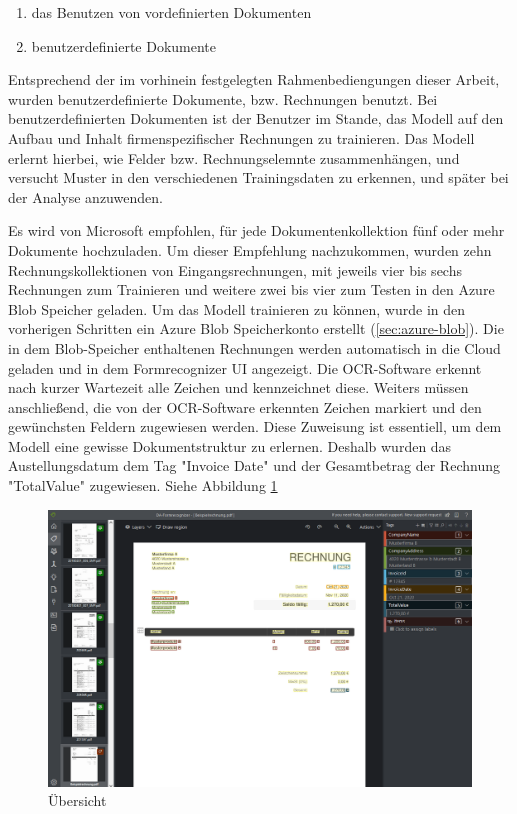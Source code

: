 \begin{enumerate}
    \item das Benutzen von vordefinierten Dokumenten 
    \item benutzerdefinierte Dokumente
\end{enumerate}

Entsprechend der im vorhinein festgelegten Rahmenbediengungen dieser Arbeit, wurden benutzerdefinierte Dokumente, bzw. Rechnungen benutzt.
Bei benutzerdefinierten Dokumenten ist der Benutzer im Stande, das Modell auf den Aufbau und Inhalt firmenspezifischer Rechnungen zu trainieren.
Das Modell erlernt hierbei, wie Felder bzw. Rechnungselemnte zusammenhängen, und versucht Muster in den verschiedenen Trainingsdaten zu erkennen, und später
bei der Analyse anzuwenden. 

Es wird von Microsoft empfohlen, für jede Dokumentenkollektion fünf oder mehr Dokumente hochzuladen. Um dieser Empfehlung nachzukommen, wurden zehn Rechnungskollektionen von Eingangsrechnungen, mit jeweils vier bis sechs Rechnungen zum Trainieren und weitere zwei bis vier zum Testen in den Azure Blob Speicher geladen. Um das Modell trainieren zu können, wurde in den vorherigen Schritten ein Azure Blob Speicherkonto erstellt (\ref{sec:azure-blob}). Die in dem Blob-Speicher enthaltenen Rechnungen werden automatisch in die Cloud geladen und in dem Formrecognizer UI angezeigt. Die OCR-Software erkennt nach kurzer Wartezeit alle Zeichen und kennzeichnet diese. Weiters müssen anschließend, die von der OCR-Software erkennten Zeichen markiert und den gewünchsten Feldern zugewiesen werden. Diese Zuweisung ist essentiell, um dem Modell eine gewisse Dokumentstruktur zu erlernen. Deshalb wurden das Austellungsdatum dem Tag "Invoice Date" und der Gesamtbetrag der Rechnung "TotalValue" zugewiesen.
Siehe Abbildung \ref{fig:formrecognizer-invoice-tagging}

\begin{figure}[h]
    \centering
    \includegraphics[scale=0.4]{sections/cloud-computing/images/formrecognizer-invoice-tagging.PNG}
    \caption{Übersicht}
    \label{fig:formrecognizer-invoice-tagging}
\end{figure}

